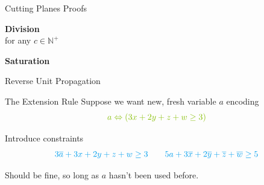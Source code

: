 \documentclass[aspectratio=169,compress,10pt]{beamer}
\begin{document}
\begin{frame}{Cutting Planes Proofs}
    \begin{minipage}[c]{0.35\framewidth}
        \textcolor{uofgcobalt}{\textbf{Division}}\\
        for any $c \in \mathbb{N^+}$
    \end{minipage}\hfill\begin{minipage}[c]{0.60\framewidth}\begin{prooftree}
    \end{prooftree}\end{minipage}\medskip

    \begin{minipage}[c]{0.35\framewidth}
        \textcolor{uofgcobalt}{\textbf{Saturation}}
    \end{minipage}\hfill\begin{minipage}[c]{0.60\framewidth}\begin{prooftree}
    \end{prooftree}\end{minipage}
\end{frame}

\begin{frame}{Reverse Unit Propagation}
\end{frame}

\begin{frame}{The Extension Rule}
  Suppose we want new, fresh variable
  $a$ encoding
  \begin{equation*}
      \textcolor{uofglawn}{
        a
        \Leftrightarrow
        ( 3x + 2y + z + w \ge 3 )
      }
  \end{equation*}

  Introduce constraints
  \begin{equation*}
      \textcolor{uofgcobalt}{
    3 \overline{a} + 3x + 2y + z + w \ge 3
    \qquad
    5 a +
    3 \overline{x} + 2 \overline{y}  + \overline{z} + \overline{w} \ge 5
}
  \end{equation*}

  Should be fine, so long as $a$ hasn't been used before.
\end{frame}
\end{document}
